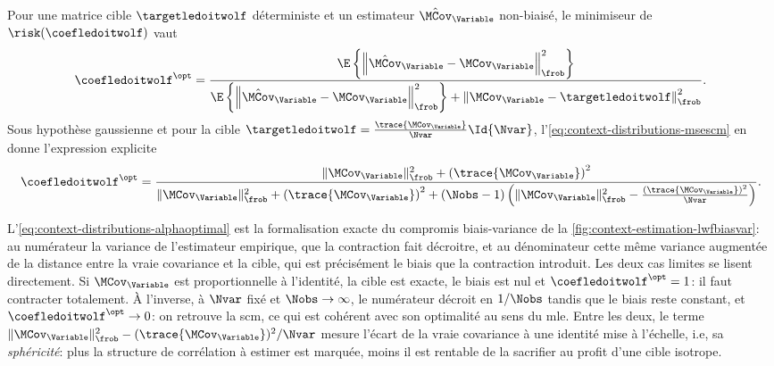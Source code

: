 \begin{proposition}
\label{prop:context-distributions-alphaoptimal}
  Pour une matrice cible $\targetledoitwolf$ déterministe et un estimateur $\hat{\MCov}_\Variable$ non-biaisé, le minimiseur de $\risk(\coefledoitwolf)$ vaut
  \begin{equation}
    \coefledoitwolf^\opt
    =
    \frac{
      \E\left\{\left\|\hat{\MCov}_\Variable - \MCov_\Variable\right\|_\frob^2\right\}
    }{
      \E\left\{\left\|\hat{\MCov}_\Variable - \MCov_\Variable\right\|_\frob^2\right\}
      + \left\|\MCov_\Variable - \targetledoitwolf\right\|_\frob^2
    }.
    \label{eq:context-distributions-alphaoptimal}
  \end{equation}
  Sous hypothèse gaussienne et pour la cible $\targetledoitwolf = \frac{\trace{\MCov_\Variable}}{\Nvar}\Id{\Nvar}$, l'\cref{eq:context-distributions-msescm} en donne l'expression explicite
  \begin{equation}
    \coefledoitwolf^\opt
    =
    \frac{
      \|\MCov_\Variable\|_\frob^2 + \left(\trace{\MCov_\Variable}\right)^2
    }{
      \|\MCov_\Variable\|_\frob^2 + \left(\trace{\MCov_\Variable}\right)^2
      + (\Nobs-1)\left(\|\MCov_\Variable\|_\frob^2 - \frac{\left(\trace{\MCov_\Variable}\right)^2}{\Nvar}\right)
    }.
    \label{eq:context-distributions-alphaoptimalgauss}
  \end{equation}
\end{proposition}

L'\cref{eq:context-distributions-alphaoptimal} est la formalisation exacte du compromis biais-variance de la \cref{fig:context-estimation-lwfbiasvar}: au numérateur la variance de l'estimateur empirique, que la contraction fait décroitre, et au dénominateur cette même variance augmentée de la distance entre la vraie covariance et la cible, qui est précisément le biais que la contraction introduit. Les deux cas limites se lisent directement. Si $\MCov_\Variable$ est proportionnelle à l'identité, la cible est exacte, le biais est nul et $\coefledoitwolf^\opt=1$: il faut contracter totalement. À l'inverse, à $\Nvar$ fixé et $\Nobs\to\infty$, le numérateur décroit en $1/\Nobs$ tandis que le biais reste constant, et $\coefledoitwolf^\opt\to 0$: on retrouve la scm, ce qui est cohérent avec son optimalité au sens du mle. Entre les deux, le terme $\|\MCov_\Variable\|_\frob^2 - (\trace{\MCov_\Variable})^2/\Nvar$ mesure l'écart de la vraie covariance à une identité mise à l'échelle, i.e, sa \emph{sphéricité}: plus la structure de corrélation à estimer est marquée, moins il est rentable de la sacrifier au profit d'une cible isotrope.

